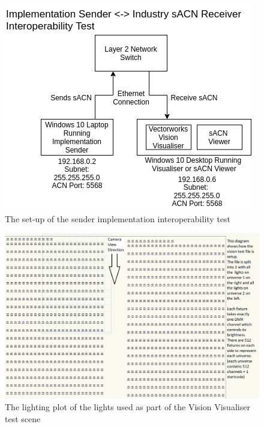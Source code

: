 \documentclass[11pt,a4paper]{article}
\begin{document}
\begin{figure}[H]
	\includegraphics[width=\textwidth]{CS4099-Visualiser-setup.png}
	\caption{The set-up of the sender implementation interoperability test}
	\label{VIS_VIEWER_SETUP}
\end{figure}


\begin{figure}[H]
	\begin{turn}{90}
		\begin{minipage}[c][\textwidth][c]{\textheight}
			\centering
			\includegraphics[width=\textwidth]{Vision-File-LX-Plot.png}
			\caption{The lighting plot of the lights used as part of the Vision Visualiser test scene}
			\label{VIS_LX_PLOT}
		\end{minipage}
	\end{turn}
\end{figure}
\end{document}
